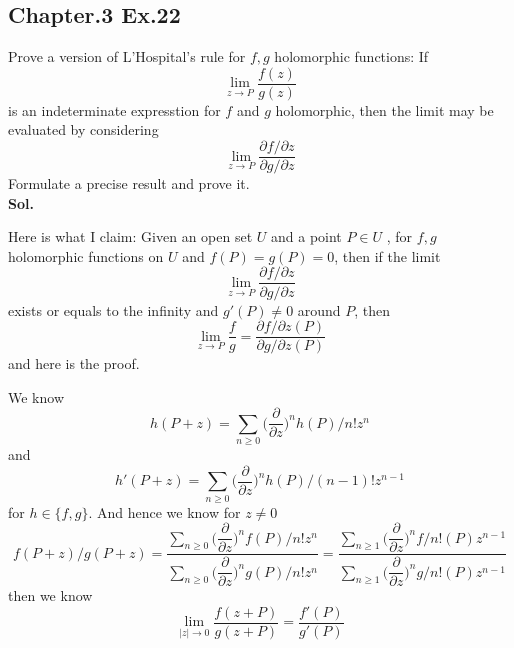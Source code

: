 \documentclass[lang=en,11pt,a4paper,citestyle =authoryear]{elegantpaper}
\newcommand{\ParZ}{\dfrac{\partial}{\partial z}}
\begin{document}
\subsection*{Chapter.3 Ex.22} 
Prove a version of L'Hospital's rule for $f,g$ holomorphic functions: If
\[
\lim_{z\to P}\dfrac{f(z)}{g(z)}
\] is an indeterminate expresstion for $f$ and $g$ holomorphic, then the limit may be evaluated by considering
\[
\lim_{z\to P}\dfrac{\partial f/\partial z}{\partial g/\partial z}
\] 
Formulate a precise result and prove it.
\vspace{0.5em}\\
\textbf{Sol.} \par
Here is what I claim:  Given an open set $U$ and a point $P\in U$ , for $f,g$ holomorphic functions on $U$ and $f(P) = g(P) =0$, then if the limit 
\[\lim_{z\to P} \dfrac{\partial f/\partial z}{\partial g/\partial z}\]
exists or equals to the infinity and $g'(P) \neq 0$ around $P$, then 
\[
\lim_{z\to P}\dfrac{f}{g} = \dfrac{\partial f/\partial z (P)}{\partial g/\partial z(P)} 
\]
and here is the proof.\par
We know
\[
h(P+z) = \sum\limits_{n\geq 0} \Big(\ParZ\Big)^nh(P)/n! z^n
\]
and
\[
h'(P+z) = \sum\limits_{n\geq 0}\Big(\ParZ\Big)^nh(P)/(n-1)! z^{n-1}
\]
for $h\in\{f,g\}$. And hence we know for $z\neq 0$
\[
f(P+z)/g(P+z) = \dfrac{\sum\limits_{n\geq 0} \Big(\ParZ\Big)^nf(P)/n! z^n}{\sum\limits_{n\geq 0} \Big(\ParZ\Big)^ng(P)/n! z^n} = \dfrac{\sum\limits_{n\geq 1} \Big(\ParZ\Big)^nf/n! (P)z^{n-1}}{\sum\limits_{n\geq 1} \Big(\ParZ\Big)^ng/n! (P)z^{n-1}}
\]
then we know
\[
\lim_{|z|\to 0}\dfrac{f(z+P)}{g(z+P)} = \dfrac{f'(P)}{g'(P)}
\]
\vspace{0.5em}

\addappheadtotoc
\end{document}
